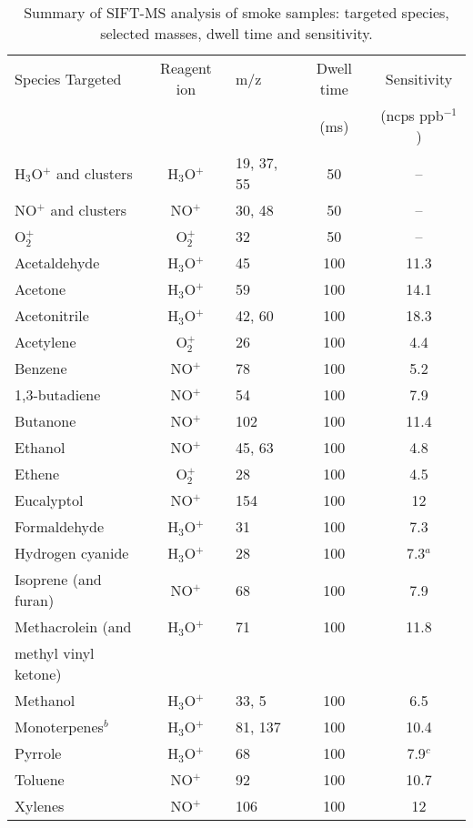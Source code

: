 \documentclass[acp, manuscript]{copernicus}
\begin{document}
\begin{table}
  \caption{Summary of SIFT-MS analysis of smoke samples: targeted species, selected masses, dwell time and sensitivity.}
  \begin{tabular}{l c l c c}
    \hline
  Species Targeted&Reagent ion&m/z&Dwell time&Sensitivity\\
  &&&(ms)&(ncps ppb$^{-1}$)\\
  \hline
  H$_3$O$^+$ and clusters&H$_3$O$^+$ & 19, 37, 55&50& -- \\
  NO$^+$ and clusters &NO$^+$ & 30, 48 & 50 & -- \\
  O$_2^+$ & O$_2^+$&32&50&--\\
  Acetaldehyde&H$_3$O$^+$&45&100&11.3\\
  Acetone&H$_3$O$^+$&59&100&14.1\\
  Acetonitrile &H$_3$O$^+$&42, 60&100&18.3\\ 
  Acetylene &O$_2^+$&26&100&4.4 \\ 
  Benzene &NO$^+$&78&100&5.2 \\
  1,3-butadiene &NO$^+$&54&100&7.9\\
  Butanone &NO$^+$&102&100&11.4 \\
  Ethanol &NO$^+$&45, 63&100&4.8\\
  Ethene &O$_2^+$&28&100&4.5\\ 
  Eucalyptol &NO$^+$&154&100&12\\
  Formaldehyde &H$_3$O$^+$&31&100&7.3 \\
  Hydrogen cyanide &H$_3$O$^+$&28&100&7.3$^a$ \\
  Isoprene (and furan) &NO$^+$&68&100&7.9 \\
  Methacrolein (and &H$_3$O$^+$&71&100&11.8\\
  methyl vinyl ketone) &&&&\\
  Methanol &H$_3$O$^+$&33, 5&100&6.5 \\
  Monoterpenes$^b$ &H$_3$O$^+$&81, 137&100&10.4 \\
  Pyrrole &H$_3$O$^+$&68&100&7.9$^c$ \\
  Toluene &NO$^+$&92&100&10.7\\ 
  Xylenes &NO$^+$&106&100&12 \\
  \end{tabular}
  \label{table:sift}
\end{table}
\end{document}
